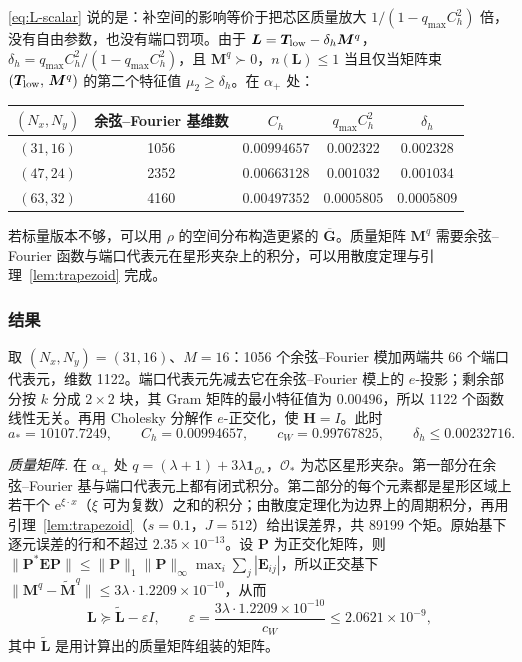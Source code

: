 \documentclass[11pt,a4paper,fontset=fandol]{ctexart}
\newcommand{\ee}{\mathrm{e}}
\theoremstyle{plain}
\theoremstyle{definition}
\theoremstyle{remark}
\begin{document}
\eqref{eq:L-scalar} 说的是：补空间的影响等价于把芯区质量放大 $1/(1-q_{\max}C_h^2)$ 倍，没有自由参数，也没有端口罚项。由于 $\bm L=\bm T_{\rm low}-\delta_h\bm M^q$，$\delta_h=q_{\max}C_h^2/(1-q_{\max}C_h^2)$，且 $\bm M^q\succ0$，$n(\bm L)\le1$ 当且仅当矩阵束 $(\bm T_{\rm low},\,\bm M^q)$ 的第二个特征值 $\mu_2\ge\delta_h$。在 $\alpha_+$ 处：
\begin{center}
\small
\begin{tabular}{ccccc}
\toprule
$(N_x,N_y)$ & 余弦--Fourier 基维数 & $C_h$ & $q_{\max}C_h^2$ & $\delta_h$ \\
\midrule
$(31,16)$ & 1056 & $0.00994657$ & $0.002322$ & $0.002328$ \\
$(47,24)$ & 2352 & $0.00663128$ & $0.001032$ & $0.001034$ \\
$(63,32)$ & 4160 & $0.00497352$ & $0.0005805$ & $0.0005809$ \\
\bottomrule
\end{tabular}
\end{center}
若标量版本不够，可以用 $\rho$ 的空间分布构造更紧的 $\overline{\bm G}$。质量矩阵 $\bm M^q$ 需要余弦--Fourier 函数与端口代表元在星形夹杂上的积分，可以用散度定理与引理~\ref{lem:trapezoid} 完成。

\subsubsection{结果}

取 $(N_x,N_y)=(31,16)$、$M=16$：1056 个余弦--Fourier 模加两端共 66 个端口代表元，维数 1122。端口代表元先减去它在余弦--Fourier 模上的 $e$-投影；剩余部分按 $k$ 分成 $2\times2$ 块，其 Gram 矩阵的最小特征值为 $0.00496$，所以 1122 个函数线性无关。再用 Cholesky 分解作 $e$-正交化，使 $\bm H=I$。此时
\[
a_*=10107.7249,\qquad C_h=0.00994657,\qquad c_W=0.99767825,\qquad\delta_h\le0.00232716 .
\]

\emph{质量矩阵.} 在 $\alpha_+$ 处 $q=(\lambda+1)+3\lambda\mathbf 1_{\mathcal O_*}$，$\mathcal O_*$ 为芯区星形夹杂。第一部分在余弦--Fourier 基与端口代表元上都有闭式积分。第二部分的每个元素都是星形区域上若干个 $\ee^{\xi\cdot x}$（$\xi$ 可为复数）之和的积分；由散度定理化为边界上的周期积分，再用引理~\ref{lem:trapezoid}（$s=0.1$，$J=512$）给出误差界，共 89199 个矩。原始基下逐元误差的行和不超过 $2.35\times10^{-13}$。设 $\bm P$ 为正交化矩阵，则 $\|\bm P^*\bm E\bm P\|\le\|\bm P\|_1\|\bm P\|_\infty\max_i\sum_j|\bm E_{ij}|$，所以正交基下 $\|\bm M^{q}-\tilde{\bm M}^{q}\|\le3\lambda\cdot1.2209\times10^{-10}$，从而
\[
\bm L\succeq\tilde{\bm L}-\varepsilon I,\qquad\varepsilon=\frac{3\lambda\cdot1.2209\times10^{-10}}{c_W}\le2.0621\times10^{-9},
\]
其中 $\tilde{\bm L}$ 是用计算出的质量矩阵组装的矩阵。
\end{document}

